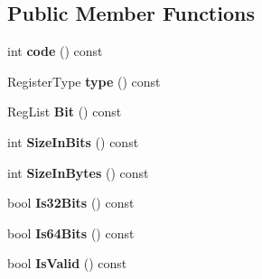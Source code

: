 \subsection*{Public Member Functions}
\begin{DoxyCompactItemize}
\item 
int {\bfseries code} () const \hypertarget{structv8_1_1internal_1_1_c_p_u_register_a6ae5700be68c94a1a582b1fbec06dca6}{}\label{structv8_1_1internal_1_1_c_p_u_register_a6ae5700be68c94a1a582b1fbec06dca6}

\item 
Register\+Type {\bfseries type} () const \hypertarget{structv8_1_1internal_1_1_c_p_u_register_ac4dedc17a2dcd0d2f289383d7a9fa188}{}\label{structv8_1_1internal_1_1_c_p_u_register_ac4dedc17a2dcd0d2f289383d7a9fa188}

\item 
Reg\+List {\bfseries Bit} () const \hypertarget{structv8_1_1internal_1_1_c_p_u_register_a1d8add77f70ad82b1b5e0f13cbe19ee8}{}\label{structv8_1_1internal_1_1_c_p_u_register_a1d8add77f70ad82b1b5e0f13cbe19ee8}

\item 
int {\bfseries Size\+In\+Bits} () const \hypertarget{structv8_1_1internal_1_1_c_p_u_register_a84d5bf133a0ffc98cebb01ea64da8efb}{}\label{structv8_1_1internal_1_1_c_p_u_register_a84d5bf133a0ffc98cebb01ea64da8efb}

\item 
int {\bfseries Size\+In\+Bytes} () const \hypertarget{structv8_1_1internal_1_1_c_p_u_register_aa1ae5925bfc5bc3e80f9d7937053f46f}{}\label{structv8_1_1internal_1_1_c_p_u_register_aa1ae5925bfc5bc3e80f9d7937053f46f}

\item 
bool {\bfseries Is32\+Bits} () const \hypertarget{structv8_1_1internal_1_1_c_p_u_register_a7bcf4c0c7ff6efac1d2426a4becf3658}{}\label{structv8_1_1internal_1_1_c_p_u_register_a7bcf4c0c7ff6efac1d2426a4becf3658}

\item 
bool {\bfseries Is64\+Bits} () const \hypertarget{structv8_1_1internal_1_1_c_p_u_register_a5e85934a36133bf33a4f71761e3563c9}{}\label{structv8_1_1internal_1_1_c_p_u_register_a5e85934a36133bf33a4f71761e3563c9}

\item 
bool {\bfseries Is\+Valid} () const \hypertarget{structv8_1_1internal_1_1_c_p_u_register_a97b28de3af09e5bb3dd33f109aa429c4}{}\label{structv8_1_1internal_1_1_c_p_u_register_a97b28de3af09e5bb3dd33f109aa429c4}


\end{DoxyCompactItemize}
